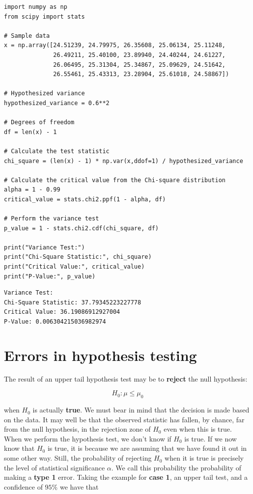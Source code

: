\documentclass[
]{book}
\begin{document}
\begin{verbatim}
import numpy as np
from scipy import stats

# Sample data
x = np.array([24.51239, 24.79975, 26.35608, 25.06134, 25.11248, 
              26.49211, 25.40100, 23.89940, 24.40244, 24.61227, 
              26.06495, 25.31304, 25.34867, 25.09629, 24.51642, 
              26.55461, 25.43313, 23.28904, 25.61018, 24.58867])

# Hypothesized variance
hypothesized_variance = 0.6**2

# Degrees of freedom
df = len(x) - 1

# Calculate the test statistic
chi_square = (len(x) - 1) * np.var(x,ddof=1) / hypothesized_variance

# Calculate the critical value from the Chi-square distribution
alpha = 1 - 0.99
critical_value = stats.chi2.ppf(1 - alpha, df)

# Perform the variance test
p_value = 1 - stats.chi2.cdf(chi_square, df)

print("Variance Test:")
print("Chi-Square Statistic:", chi_square)
print("Critical Value:", critical_value)
print("P-Value:", p_value)
\end{verbatim}

\begin{verbatim}
Variance Test:
Chi-Square Statistic: 37.79345223227778
Critical Value: 36.19086912927004
P-Value: 0.006304215036982974
\end{verbatim}

\hypertarget{errors-in-hypothesis-testing}{%
\section{Errors in hypothesis testing}\label{errors-in-hypothesis-testing}}

The result of an upper tail hypothesis test may be to \textbf{reject} the null hypothesis:

\[H_0: \mu\leq\mu_0\]

when \(H_0\) is actually \textbf{true}. We must bear in mind that the decision is made based on the data. It may well be that the observed statistic has fallen, by chance, far from the null hypothesis, in the rejection zone of \(H_0\) even when this is true. When we perform the hypothesis test, we don't know if \(H_0\) is true. If we now know that \(H_0\) is true, it is because we are assuming that we have found it out in some other way. Still, the probability of rejecting \(H_0\) when it is true is precisely the level of statistical significance \(\alpha\). We call this probability the probability of making a \textbf{type 1} error. Taking the example for \textbf{case 1}, an upper tail test, and a confidence of \(95\%\) we have that
\end{document}

